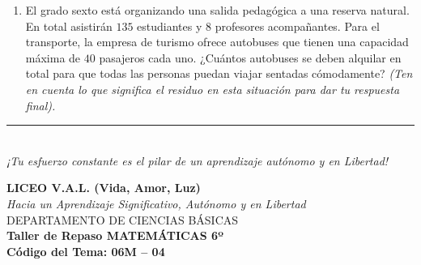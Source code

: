 \documentclass[12pt, letterpaper]{article}
\begin{document}
\begin{enumerate}[itemsep=0.8cm]
		Si en cada estante de la biblioteca caben exactamente $35$ libros, responde a partir de los datos:
		\begin{enumerate}[label=\alph*., itemsep=0.2cm, topsep=0.2cm]
			\item ¿Cuántos estantes completos se pueden llenar únicamente con los libros de Literatura y Cuentos? ¿Quedan libros sobrando?
			\item ¿Cuántos estantes completos se llenarán con los libros de Ciencias y Naturaleza y cuántos libros faltarían para llenar un estante más de esta categoría?
		\end{enumerate}
		
		\item El grado sexto está organizando una salida pedagógica a una reserva natural. En total asistirán $135$ estudiantes y $8$ profesores acompañantes. Para el transporte, la empresa de turismo ofrece autobuses que tienen una capacidad máxima de $40$ pasajeros cada uno. ¿Cuántos autobuses se deben alquilar en total para que todas las personas puedan viajar sentadas cómodamente? \textit{(Ten en cuenta lo que significa el residuo en esta situación para dar tu respuesta final).}
		
	\end{enumerate}
	
	\vfill
	\begin{center}
		\rule{0.5\textwidth}{0.4pt} \\
		\vspace{0.2cm}
		\textit{¡Tu esfuerzo constante es el pilar de un aprendizaje autónomo y en Libertad!}
	\end{center}
	
	\newpage
	
	\begin{center}
		{\Large \textbf{LICEO V.A.L. (Vida, Amor, Luz)}}\\[0.1cm]
		{\normalsize \textit{Hacia un Aprendizaje Significativo, Autónomo y en Libertad}}\\[0.2cm]
		{\large DEPARTAMENTO DE CIENCIAS BÁSICAS}\\[0.1cm]
		\textbf{Taller de Repaso MATEMÁTICAS 6º}\\[0.1cm]
		\textbf{Código del Tema: 06M – 04}\\[0.1cm]
	\end{center}
	
\end{document}
